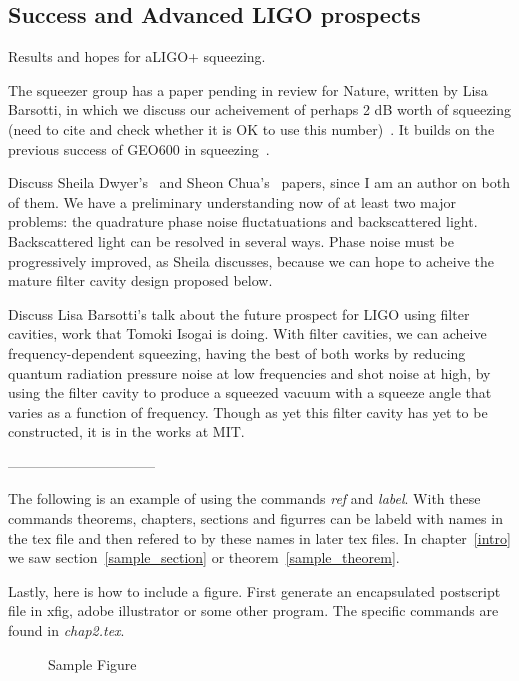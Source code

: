         \subsection{Success and Advanced LIGO prospects}
        \label{squeezing_success}

            Results and hopes for aLIGO+ squeezing.

	    The squeezer group has a paper pending in review for Nature, written by Lisa Barsotti, in which we discuss our acheivement of perhaps 2 dB worth of squeezing (need to cite and check whether it is OK to use this number)~\cite{BarsottiNatureSqueezing}. It builds on the previous success of GEO600 in squeezing~\cite{GEO600NatureSqueezing}.

	    Discuss Sheila Dwyer's~\cite{DwyerPhaseNoise} and Sheon Chua's~\cite{ChuaBackscatteredLight} papers, since I am an author on both of them. We have a preliminary understanding now of at least two major problems: the quadrature phase noise fluctatuations and backscattered light. Backscattered light can be resolved in several ways. Phase noise must be progressively improved, as Sheila discusses, because we can hope to acheive the mature filter cavity design proposed below.

Discuss Lisa Barsotti's talk about the future prospect for LIGO using filter cavities, work that Tomoki Isogai is doing. With filter cavities, we can acheive frequency-dependent squeezing, having the best of both works by reducing quantum radiation pressure noise at low frequencies and shot noise at high, by using the filter cavity to produce a squeezed vacuum with a squeeze angle that varies as a function of frequency. Though as yet this filter cavity has yet to be constructed, it is in the works at MIT.

        -------------------------------- 

	The following is an example of using the commands \textit{ref}
	and \textit{label}. With these commands theorems, chapters,
	sections and figurres can be labeld with names in the tex file
	and then refered to by these names in later tex files. In
	chapter~\ref{intro} we saw section~\ref{sample_section} or
	theorem~\ref{sample_theorem}.

	Lastly, here is how to include a figure. First generate an
	encapsulated postscript file in xfig, adobe illustrator or
	some other program. The specific commands are found in
	\textit{chap2.tex}.

        \begin{figure}[htb]
        \centerline{ }
        \caption{Sample Figure}
        \label{sample_figure}
        \end{figure}

